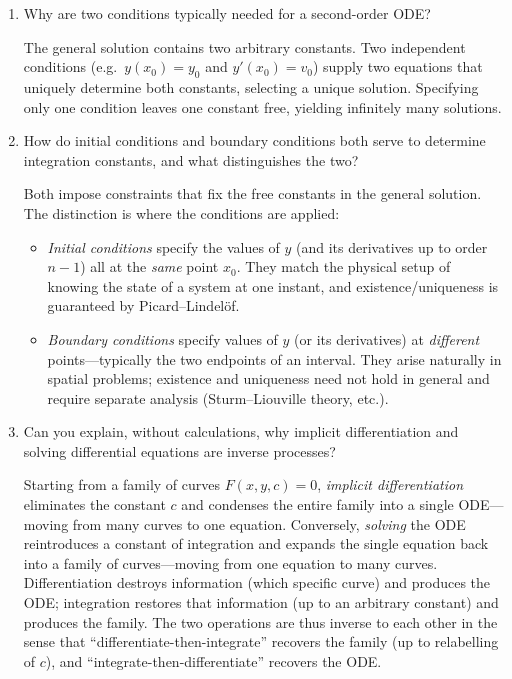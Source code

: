 \documentclass{self-check}
\begin{document}
\begin{enumerate}[leftmargin=*, itemsep=8pt]
  \item Why are two conditions typically needed for a second-order ODE?

    \begin{answer} The general solution contains two arbitrary
      constants.  Two independent conditions (e.g.\ $y(x_0)=y_0$ and
      $y'(x_0)=v_0$) supply two equations that uniquely determine both
      constants, selecting a unique solution.  Specifying only one
      condition leaves one constant free, yielding infinitely many solutions.
    \end{answer}

  \item How do initial conditions and boundary conditions both serve
    to determine integration constants, and what distinguishes the two?

    \begin{answer} Both impose constraints that fix the free
      constants in the general solution.  The distinction is where the
      conditions are applied:
      \begin{itemize}
        \item \emph{Initial conditions} specify the values of $y$ (and
          its derivatives up to order $n-1$) all at the \emph{same}
          point $x_0$.  They match the physical setup of knowing the
          state of a system at one instant, and existence/uniqueness is
          guaranteed by Picard--Lindelöf.
        \item \emph{Boundary conditions} specify values of $y$ (or its
          derivatives) at \emph{different} points---typically the two
          endpoints of an interval.  They arise naturally in spatial
          problems; existence and uniqueness need not hold in general
          and require separate analysis (Sturm--Liouville theory, etc.).
      \end{itemize}
    \end{answer}

  \item Can you explain, without calculations, why implicit
    differentiation and solving differential equations are inverse processes?

    \begin{answer} Starting from a family of curves $F(x,y,c)=0$,
      \emph{implicit differentiation} eliminates the constant $c$ and
      condenses the entire family into a single ODE---moving from many
      curves to one equation.  Conversely, \emph{solving} the ODE
      reintroduces a constant of integration and expands the single
      equation back into a family of curves---moving from one equation
      to many curves.  Differentiation destroys information (which
      specific curve) and produces the ODE; integration restores that
      information (up to an arbitrary constant) and produces the
      family.  The two operations are thus inverse to each other in the
      sense that ``differentiate-then-integrate'' recovers the family
      (up to relabelling of $c$), and ``integrate-then-differentiate''
      recovers the ODE.
    \end{answer}

\end{enumerate}
\end{document}
